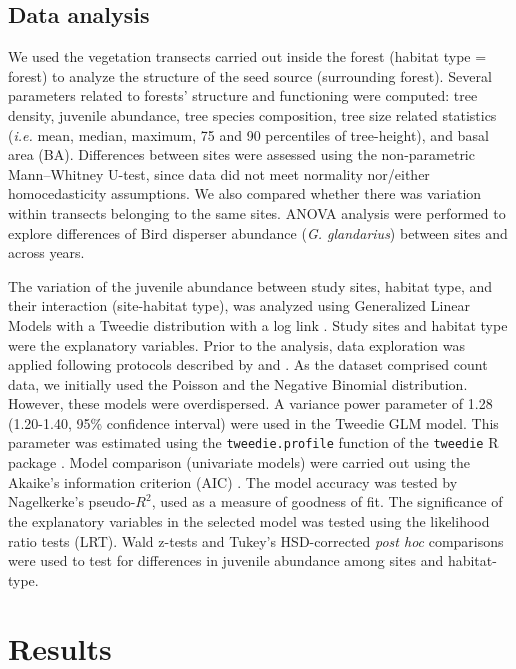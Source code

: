 \subsection{Data analysis}\label{sec:coloniza:analysis}
We used the vegetation transects carried out inside the forest (habitat type = forest) to analyze the structure of the seed source (surrounding forest). Several parameters related to forests' structure and functioning were computed: tree density, juvenile abundance, tree species composition, tree size related statistics (\emph{i.e.} mean, median, maximum, 75 and 90 percentiles of tree-height), and basal area (BA). Differences between sites were assessed using the non-parametric Mann–Whitney U-test, since data did not meet normality nor/either homocedasticity assumptions. We also compared whether there was variation within transects belonging to the same sites. ANOVA analysis were performed to explore differences of Bird disperser abundance (\emph{G. glandarius}) between sites and across years. 

The variation of the juvenile abundance between study sites, habitat type, and their interaction (site-habitat type), was analyzed using Generalized Linear Models with a Tweedie distribution with a log link \autocite{DunnSmyth2018TweedieGLMs}. Study sites and habitat type were the explanatory variables. Prior to the analysis, data exploration was applied following protocols described by \citet{Zuuretal2010ProtocolData} and \citet{IenoZuur2015BeginnerGuide}. As the dataset comprised count data, we initially used the Poisson and the Negative Binomial distribution. However, these models were overdispersed. A variance power parameter of 1.28 (1.20-1.40, 95\% confidence interval) were used in the Tweedie GLM model. This parameter was estimated using the \texttt{tweedie.profile} function of the \texttt{tweedie} R package \autocites{DunnSmyth2005SeriesEvaluation,Dunn2017Tweedie}. Model comparison (univariate models) were carried out using the Akaike's information criterion (AIC) \autocites{BurnhamAnderson2010ModelSelection}. The model accuracy was tested by Nagelkerke's pseudo-$R^2$, used as a measure of goodness of fit. The significance of the explanatory variables in the selected model was tested using the likelihood ratio tests (LRT). Wald z-tests and Tukey's HSD-corrected \emph{post hoc} comparisons were used to test for differences in juvenile abundance among sites and habitat-type. 


\section{Results}\label{sec:coloniza:results}


